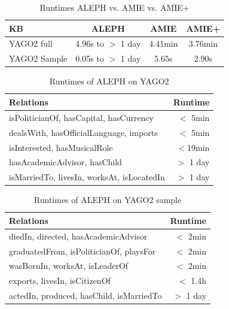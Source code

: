 \begin{table}
\begin{tabular}{l|ccc}
KB & ALEPH & AMIE & AMIE+\\
\hline
YAGO2 full & 4.96s to $>$ 1 day & 4.41min & 3.76min\\
YAGO2 Sample & 0.05s to $>$ 1 day & 5.65s & 2.90s \\
\end{tabular}
\caption{Runtimes ALEPH vs. AMIE vs. AMIE+}
\label{alephrun0}
\end{table}
\begin{table}[t]
 \begin{tabular}{l|r}
Relations & Runtime\\
\hline
isPoliticianOf, hasCapital, hasCurrency & $<$ 5min\\
dealsWith, hasOfficialLanguage, imports & $<$ 5min\\
isInterested, hasMusicalRole & $<$19min\\
hasAcademicAdvisor, hasChild& $>$ 1 day\\
isMarriedTo, livesIn, worksAt, isLocatedIn& $>$ 1 day\\ %
\end{tabular}
\caption{Runtimes of ALEPH on YAGO2}
\label{alephrun1}
\end{table}
\begin{table}[t]
\begin{tabular}{l|r}
Relations & Runtime\\
\hline
diedIn, directed, hasAcademicAdvisor & $<$ 2min\\
graduatedFrom, isPoliticianOf, playsFor & $<$ 2min\\
wasBornIn, worksAt, isLeaderOf &  $<$ 2min\\
exports, livesIn, isCitizenOf & $<$ 1.4h\\
actedIn, produced, hasChild, isMarriedTo & $>$ 1 day\\ %
\end{tabular}
\caption{Runtimes of ALEPH on YAGO2 sample}
\label{alephrun2}
\end{table}

